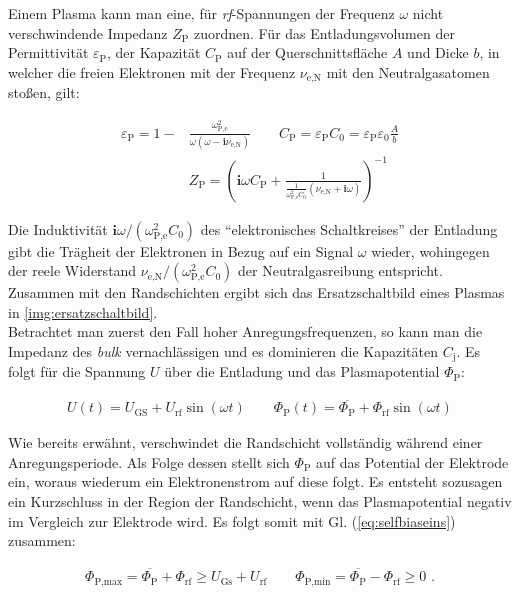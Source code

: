 \documentclass[numbers=noenddot,a4paper]{scrartcl}
\newcommand{\ix}[1]{_\text{#1}}
\newcommand{\imag}{\mathbf{i}}
\newcommand{\tilt}[1]{\textit{#1}}
\begin{document}
			Einem Plasma kann man eine, für \tilt{rf}-Spannungen der Frequenz $\omega$ nicht verschwindende Impedanz $Z\ix{P}$ zuordnen. Für das Entladungsvolumen der Permittivität $\varepsilon\ix{P}$, der Kapazität $C\ix{P}$ auf der Querschnittsfläche $A$ und Dicke $b$, in welcher die freien Elektronen mit der Frequenz $\nu\ix{e,N}$ mit den Neutralgasatomen stoßen, gilt:
			
			\begin{align}
			\varepsilon\ix{P}=1-&\frac{\omega\ix{P,e}^2}{\omega\left(\omega-\imag\nu\ix{e,N}\right)} \quad \quad C\ix{P}=\varepsilon\ix{P}C\ix{0}=\varepsilon\ix{P}\varepsilon\ix{0}\frac{A}{b} \\
			&Z\ix{P}=\left(\imag\omega C\ix{P}+ \frac{1}{\frac{1}{\omega\ix{P,e}^2C\ix{0}}\left(\nu\ix{e,N}+\imag\omega\right)}\right)^{-1}
			\end{align}
			
			Die Induktivität $\imag\omega/\left(\omega\ix{P,e}^2C\ix{0}\right)$ des "`elektronisches Schaltkreises"' der Entladung gibt die Trägheit der Elektronen in Bezug auf ein Signal $\omega$ wieder, wohingegen der reele Widerstand $\nu\ix{e,N}/\left(\omega\ix{P,e}^2C\ix{0}\right)$ der Neutralgasreibung entspricht. Zusammen mit den Randschichten ergibt sich das Ersatzschaltbild eines Plasmas in \ref{img:ersatzschaltbild}.\\
			Betrachtet man zuerst den Fall hoher Anregungsfrequenzen, so kann man die Impedanz des \tilt{bulk} vernachlässigen und es dominieren die Kapazitäten $C\ix{j}$. Es folgt für die Spannung $U$ über die Entladung und das Plasmapotential $\Phi\ix{P}$:
			
				\begin{align}
					U\left(t\right)=U\ix{GS}+U\ix{rf}\sin\left(\omega t\right) \quad \quad \Phi\ix{P}\left(t\right)=\overline{\Phi\ix{P}}+\Phi\ix{rf}\sin\left(\omega t\right) \label{eq:selfbiaseins}
				\end{align}
				
			Wie bereits erwähnt, verschwindet die Randschicht vollständig während einer Anregungsperiode. Als Folge dessen stellt sich $\Phi\ix{P}$ auf das Potential der Elektrode ein, woraus wiederum ein Elektronenstrom auf diese folgt. Es entsteht sozusagen ein Kurzschluss in der Region der Randschicht, wenn das Plasmapotential negativ im Vergleich zur Elektrode wird. Es folgt somit mit Gl. (\ref{eq:selfbiaseins}) zusammen:
			
				\begin{align}
					\Phi\ix{P,max}=\overline{\Phi\ix{P}}+\Phi\ix{rf}\geq U\ix{Gs}+U\ix{rf} \quad \quad \Phi\ix{P,min}=\overline{\Phi\ix{P}}-\Phi\ix{rf}\geq 0\, \, . \label{eq:ungleichungen}
				\end{align}
				
\end{document}
